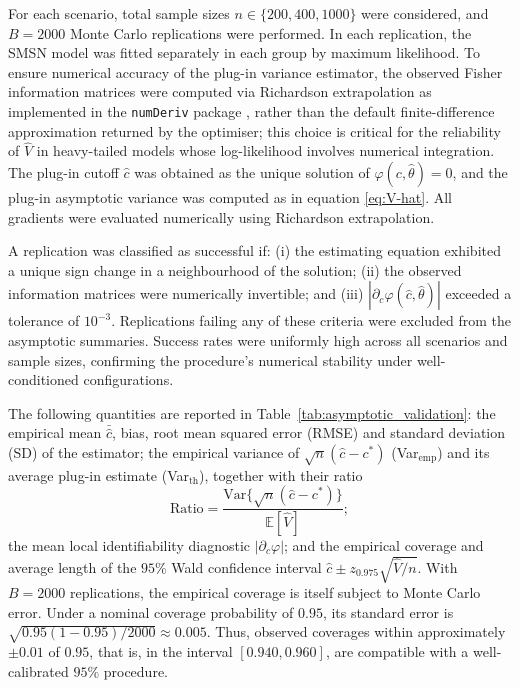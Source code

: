 \documentclass[11pt,a4paper]{article}
\theoremstyle{definition}
\theoremstyle{remark}
\newcommand{\1}{\mathbf{1}}
\begin{document}
For each scenario, total sample sizes
$n\in\{200,400,1000\}$ were considered, and
$B=2000$ Monte Carlo replications were performed.
In each replication, the SMSN model was fitted separately
in each group by maximum likelihood.
To ensure numerical accuracy of the plug-in variance
estimator, the observed Fisher information matrices were
computed via Richardson extrapolation as implemented in the
\texttt{numDeriv} package \citep{numDeriv}, rather than
the default finite-difference approximation returned by
the optimiser; this choice is critical for the reliability
of $\hat{V}$ in heavy-tailed models whose log-likelihood
involves numerical integration.
The plug-in cutoff $\hat{c}$ was obtained as the unique
solution of $\varphi(c,\hat\theta)=0$, and the plug-in asymptotic variance was computed as in equation \eqref{eq:V-hat}.
All gradients were evaluated numerically using Richardson extrapolation.

A replication was classified as successful if:
(i) the estimating equation exhibited a unique sign change in a neighbourhood of the solution;
(ii) the observed information matrices were numerically invertible; and
(iii) $|\partial_c\varphi(\hat{c},\hat\theta)|$ exceeded a tolerance of $10^{-3}$.
Replications failing any of these criteria were excluded from the asymptotic summaries.
Success rates were uniformly high across all scenarios and sample sizes, confirming the procedure's numerical stability under well-conditioned configurations.

The following quantities are reported in
Table~\ref{tab:asymptotic_validation}:
the empirical mean $\bar{\hat{c}}$, bias, root mean squared error (RMSE) and standard deviation (SD) of the estimator; the empirical variance of $\sqrt{n}(\hat{c}-c^*)$
(Var$_\mathrm{emp}$) and its average plug-in estimate
(Var$_\mathrm{th}$), together with their ratio
\[
\text{Ratio}
=
\frac{
  \mathrm{Var}\bigl\{\sqrt{n}(\hat{c}-c^*)\bigr\}
}{
  \mathbb{E}[\hat{V}]
};
\]
the mean local identifiability diagnostic
$|\partial_c\varphi|$; and the empirical coverage and
average length of the $95\%$ Wald confidence interval $\hat{c}\pm z_{0.975}\sqrt{\hat{V}/n}$.
With $B=2000$ replications, the empirical coverage is itself subject
to Monte Carlo error. Under a nominal coverage probability of $0.95$,
its standard error is $\sqrt{0.95(1-0.95)/2000}\approx 0.005$.
Thus, observed coverages within approximately $\pm 0.01$ of $0.95$,
that is, in the interval $[0.940,0.960]$, are compatible with a
well-calibrated $95\%$ procedure.
\end{document}
